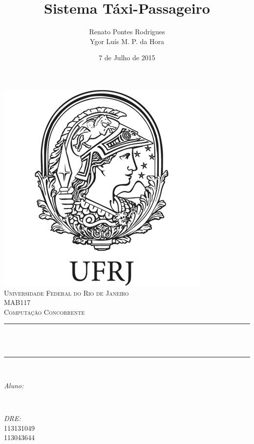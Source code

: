 \documentclass[a4paper,landscape,12pt]{article}
\title{Sistema Táxi-Passageiro}			                    %
\author{Renato Pontes Rodrigues\\Ygor Luís M. P. da Hora}	%
\date{7 de Julho de 2015}									%
\makeatletter
\let\thetitle\@title
\let\theauthor\@author
\let\thedate\@date
\makeatother
\begin{document}
\lstset{language=C++,basicstyle=\footnotesize\ttfamily,breaklines=true, tabsize=4}

\begin{titlepage}
	\centering
    \vspace*{0.5 cm}
    \includegraphics[scale = 0.50]{minerva.jpg}\\[1.0 cm]	%
    \textsc{\LARGE Universidade Federal do Rio de Janeiro}\\[2.0 cm]
	\textsc{\Large MAB117}\\[0.5 cm]				    %
	\textsc{\large Computação Concorrente}\\[0.5 cm]	%
	\rule{\linewidth}{0.2 mm} \\[0.4 cm]
	{ \huge \bfseries \thetitle}\\
	\rule{\linewidth}{0.2 mm} \\[1.5 cm]
	
	\begin{minipage}{0.4\textwidth}
		\begin{flushleft} \large
			\emph{Aluno:}\\
			\theauthor
			\end{flushleft}
			\end{minipage}~
			\begin{minipage}{0.4\textwidth}
			\begin{flushright} \large
			\emph{DRE:} \\
			113131049\\113043644						%
		\end{flushright}
	\end{minipage}\\[2 cm]
	
	{\large \thedate}\\[2 cm]
 
	\vfill
	
\end{titlepage}
\end{document}
